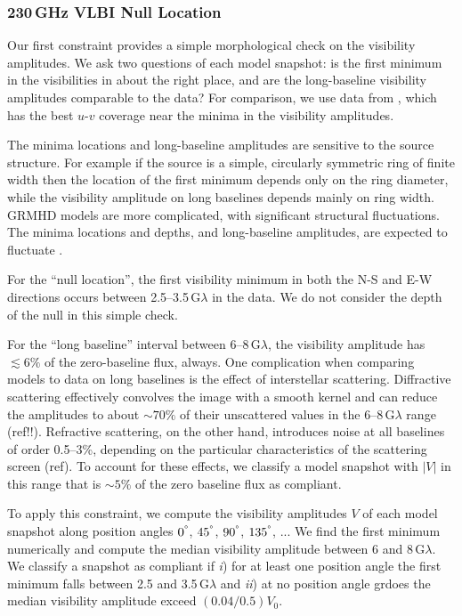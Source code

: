 \subsubsection{230\,GHz VLBI Null Location}

Our first constraint provides a simple morphological check on the visibility amplitudes.
We ask two questions of each model snapshot: is the first minimum in the visibilities in about the right place,
and are the long-baseline visibility amplitudes comparable to the data?
For comparison, we use data from \aprilvii, which has the best $u$-$v$ coverage near the minima in the visibility amplitudes.

The minima locations and long-baseline amplitudes are sensitive to the source structure.
For example if the source is a simple, circularly symmetric ring of finite width then the location of the first minimum depends only on the ring diameter, while the visibility amplitude on long baselines depends mainly on ring width.
GRMHD models are more complicated, with significant structural fluctuations.
The minima locations and depths, and long-baseline amplitudes, are expected to fluctuate \citep[e.g.,]{2018ApJ...856..163M, M87PaperV}.

For the ``null location'', the first visibility minimum in both the N-S and E-W directions occurs between 2.5--3.5\,G$\lambda$ in the data.
We do not consider the depth of the null in this simple check.

For the ``long baseline'' interval between 6--8\,G$\lambda$, the visibility amplitude has $\lesssim 6\%$ of the zero-baseline flux, always.
One complication when comparing models to data on long baselines is the effect of interstellar scattering.
Diffractive scattering effectively convolves the image with a smooth kernel and can reduce the amplitudes to about $\sim 70\%$ of their unscattered values in the 6--8\,G$\lambda$ range (ref!!).
Refractive scattering, on the other hand, introduces noise at all baselines of order 0.5--3\%, depending on the particular characteristics of the scattering screen (ref).  To account for these effects, we classify a model snapshot with $|V|$ in this range that is $\sim 5\%$ of the zero baseline flux as compliant.

To apply this constraint, we compute the visibility amplitudes $V$ of each model snapshot along position angles $0^\degree$, $45^\degree$, $90^\degree$, $135^\degree$, ...  We find the first minimum numerically and compute the median visibility amplitude between 6 and 8\,G$\lambda$.
We classify a snapshot as compliant if \emph{i}) for at least one position angle the first minimum falls between 2.5 and 3.5\,G$\lambda$ and \emph{ii}) at no position angle grdoes the median visibility amplitude 
exceed $(0.04 / 0.5) V_0$.

